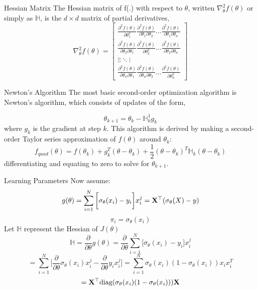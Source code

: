 \documentclass{beamer}
\begin{document}
\begin{frame}{Hessian Matrix}
The Hessian matrix of f(.) with respect to $\theta$, written $\nabla _{\theta}^{2}f(\theta)$ or simply as $\mathbb{H}$, is the $d \times d$ matrix of partial derivatives,
\begin{equation*}
\nabla _{\theta}^{2}f(\theta) = \begin{bmatrix} 
\frac{\partial^{2}f(\theta)}{\partial \theta_{1}^{2}} \frac{\partial^{2}f(\theta)}{\partial \theta_{1}\partial \theta_{2}} \ldots \frac{\partial^{2}f(\theta)}{\partial \theta_{1}\partial \theta_{n}} \\
\frac{\partial^{2}f(\theta)}{\partial \theta_{2}\partial \theta_{1}} \frac{\partial^{2}f(\theta)}{\partial \theta_{2}^{2}} \ldots \frac{\partial^{2}f(\theta)}{\partial \theta_{2}\partial \theta_{n}} \\
\vdots \vdots \ddots \vdots \\
\frac{\partial^{2}f(\theta)}{\partial \theta_{n} \partial \theta_{1}} \frac{\partial^{2}f(\theta)}{\partial \theta_{n}\partial \theta_{2}} \ldots \frac{\partial^{2}f(\theta)}{\partial \theta_{n}^{2}}
\end{bmatrix}
\end{equation*}

\end{frame}
\begin{frame}{Newton's Algorithm}
The most basic second-order optimization algorithm is Newton's algorithm, which consists of updates of the form,

$$\theta_{k+1} = \theta_{k} - \mathbb{H}_{k}^{1}g_{k}$$
where $g_{k}$ is the gradient at step $k$. This algorithm is derived by making a second-order Taylor series approximation of $f(\theta)$ around $\theta_{k}$:
$$f_{quad}(\theta) = f(\theta_{k}) + g_{k}^{T}(\theta - \theta_{k}) + \frac{1}{2}(\theta - \theta_{k})^{T}\mathbb{H}_{k}(\theta - \theta_{k})$$
differentiating and equating to zero to solve for $\theta_{k+1}$.
\end{frame}
\begin{frame}{Learning Parameters}
Now assume:
$$g(\theta) = \sum_{i=1}^{N}\bigg[\sigma_{\theta}(x_{i}) - y_{i}\bigg]x_{i}^{j} = \mathbf{X}^\top(\sigma_{\theta}(X) - y)$$
$$\pi_{i} = \sigma_{\theta}(x_{i})$$
Let $\mathbb{H}$ represent the Hessian of $J(\theta)$
\[
\mathbb{H} = \frac{\partial}{\partial \theta} g(\theta) = \frac{\partial}{\partial \theta} \sum_{i=1}^{N} \bigg[\sigma_{\theta}(x_{i}) - y_{i}\bigg]x_{i}^{j}
\]
\[
= \sum_{i=1}^{N} \bigg[\frac{\partial}{\partial \theta}\sigma_{\theta}(x_{i})x_{i}^{j} - \frac{\partial}{\partial \theta} y_{i}x_{i}^{j}\bigg] = \sum_{i=1}^{N} \sigma_{\theta}(x_{i}) (1 - \sigma_{\theta}(x_{i}))x_{i}x_{i}^{T}
\]
\[
= \mathbf{X}^\top\text{diag}(\sigma_{\theta}(x_{i}) (1 - \sigma_{\theta}(x_{i})))\mathbf{X}
\]
\end{frame}
\end{document}
